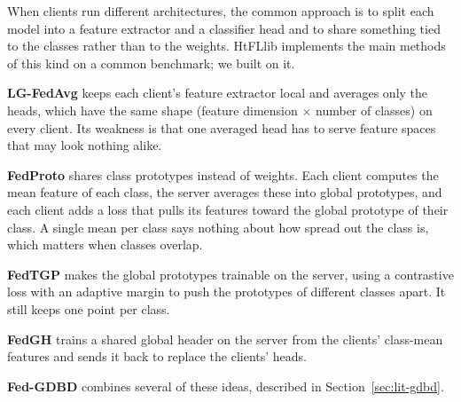 When clients run different architectures, the common approach is to split each model into a feature extractor and a classifier head and to share something tied to the classes rather than to the weights. HtFLlib \cite{zhang2025htfllib} implements the main methods of this kind on a common benchmark; we built on it.

\textbf{LG-FedAvg} \cite{liang2020lgfedavg} keeps each client's feature extractor local and averages only the heads, which have the same shape (feature dimension $\times$ number of classes) on every client. Its weakness is that one averaged head has to serve feature spaces that may look nothing alike.

\textbf{FedProto} \cite{tan2022fedproto} shares class prototypes instead of weights. Each client computes the mean feature of each class, the server averages these into global prototypes, and each client adds a loss that pulls its features toward the global prototype of their class. A single mean per class says nothing about how spread out the class is, which matters when classes overlap.

\textbf{FedTGP} \cite{zhang2024fedtgp} makes the global prototypes trainable on the server, using a contrastive loss with an adaptive margin to push the prototypes of different classes apart. It still keeps one point per class.

\textbf{FedGH} \cite{yi2023fedgh} trains a shared global header on the server from the clients' class-mean features and sends it back to replace the clients' heads.

\textbf{Fed-GDBD} \cite{zhang2025gdbd} combines several of these ideas, described in Section~\ref{sec:lit-gdbd}.

